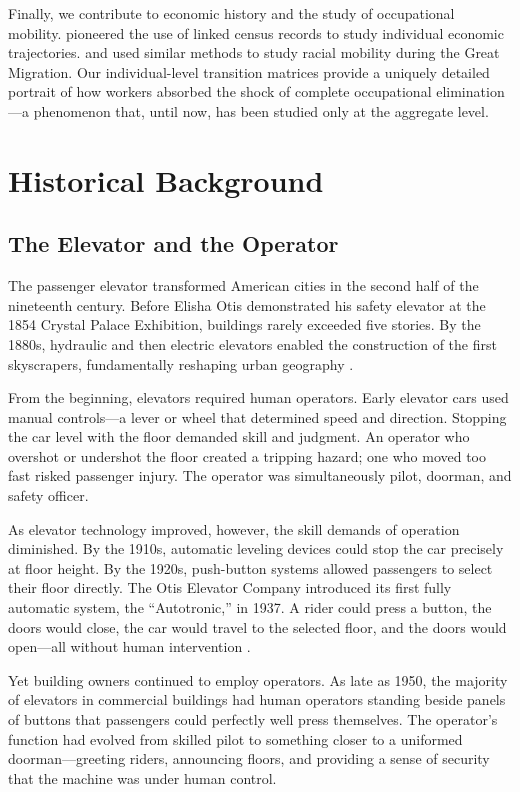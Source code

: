 \documentclass[12pt]{article}
\begin{document}
Finally, we contribute to economic history and the study of occupational mobility. \citet{abramitzky2012, abramitzky2021} pioneered the use of linked census records to study individual economic trajectories. \citet{derenoncourt2022} and \citet{collins2022} used similar methods to study racial mobility during the Great Migration. Our individual-level transition matrices provide a uniquely detailed portrait of how workers absorbed the shock of complete occupational elimination---a phenomenon that, until now, has been studied only at the aggregate level.

\section{Historical Background}

\subsection{The Elevator and the Operator}

The passenger elevator transformed American cities in the second half of the nineteenth century. Before Elisha Otis demonstrated his safety elevator at the 1854 Crystal Palace Exhibition, buildings rarely exceeded five stories. By the 1880s, hydraulic and then electric elevators enabled the construction of the first skyscrapers, fundamentally reshaping urban geography \citep{bernard2014, goodwin2005}.

From the beginning, elevators required human operators. Early elevator cars used manual controls---a lever or wheel that determined speed and direction. Stopping the car level with the floor demanded skill and judgment. An operator who overshot or undershot the floor created a tripping hazard; one who moved too fast risked passenger injury. The operator was simultaneously pilot, doorman, and safety officer.

As elevator technology improved, however, the skill demands of operation diminished. By the 1910s, automatic leveling devices could stop the car precisely at floor height. By the 1920s, push-button systems allowed passengers to select their floor directly. The Otis Elevator Company introduced its first fully automatic system, the ``Autotronic,'' in 1937. A rider could press a button, the doors would close, the car would travel to the selected floor, and the doors would open---all without human intervention \citep{price2013}.

Yet building owners continued to employ operators. As late as 1950, the majority of elevators in commercial buildings had human operators standing beside panels of buttons that passengers could perfectly well press themselves. The operator's function had evolved from skilled pilot to something closer to a uniformed doorman---greeting riders, announcing floors, and providing a sense of security that the machine was under human control.
\end{document}
